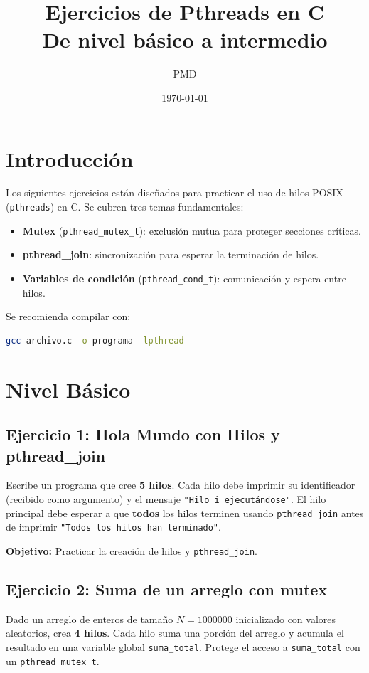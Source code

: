 \documentclass[11pt,a4paper]{article}
\title{\textbf{Ejercicios de Pthreads en C}\\ \large De nivel básico a intermedio}
\author{PMD}
\date{\today}
\begin{document}
\maketitle

\section*{Introducción}
Los siguientes ejercicios están diseñados para practicar el uso de hilos POSIX (\texttt{pthreads}) en C. Se cubren tres temas fundamentales:
\begin{itemize}
    \item \textbf{Mutex} (\texttt{pthread\_mutex\_t}): exclusión mutua para proteger secciones críticas.
    \item \textbf{pthread\_join}: sincronización para esperar la terminación de hilos.
    \item \textbf{Variables de condición} (\texttt{pthread\_cond\_t}): comunicación y espera entre hilos.
\end{itemize}

Se recomienda compilar con:
\begin{lstlisting}[language=bash,numbers=none]
gcc archivo.c -o programa -lpthread
\end{lstlisting}

\bigskip

\section{Nivel Básico}

\subsection*{Ejercicio 1: Hola Mundo con Hilos y pthread\_join}
Escribe un programa que cree \textbf{5 hilos}. Cada hilo debe imprimir su identificador (recibido como argumento) y el mensaje \texttt{"Hilo i ejecutándose"}. El hilo principal debe esperar a que \textbf{todos} los hilos terminen usando \texttt{pthread\_join} antes de imprimir \texttt{"Todos los hilos han terminado"}.

\textbf{Objetivo:} Practicar la creación de hilos y \texttt{pthread\_join}.

\subsection*{Ejercicio 2: Suma de un arreglo con mutex}
Dado un arreglo de enteros de tamaño $N = 1000000$ inicializado con valores aleatorios, crea \textbf{4 hilos}. Cada hilo suma una porción del arreglo y acumula el resultado en una variable global \texttt{suma\_total}. Protege el acceso a \texttt{suma\_total} con un \texttt{pthread\_mutex\_t}.
\end{document}

